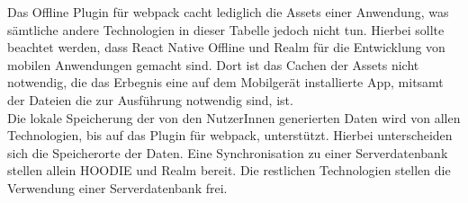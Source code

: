 %
%
%
Das Offline Plugin für webpack cacht lediglich die \gls{Assets} einer Anwendung, was sämtliche andere Technologien in dieser Tabelle jedoch nicht tun. Hierbei sollte beachtet werden, dass React Native Offline und Realm für die Entwicklung von mobilen Anwendungen gemacht sind. Dort ist das Cachen der \gls{Assets} nicht notwendig, die das Erbegnis eine auf dem Mobilgerät installierte App, mitsamt der Dateien die zur Ausführung notwendig sind, ist.\\
Die lokale Speicherung der von den NutzerInnen generierten Daten wird von allen Technologien, bis auf das Plugin für webpack, unterstützt. Hierbei unterscheiden sich die Speicherorte der Daten.
Eine Synchronisation zu einer Serverdatenbank stellen allein HOODIE und Realm bereit. Die restlichen Technologien stellen die Verwendung einer Serverdatenbank frei.